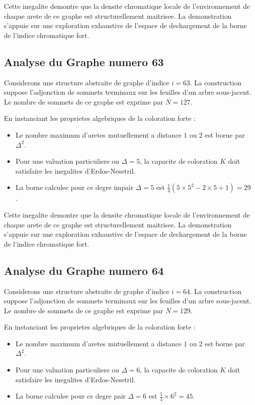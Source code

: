 \documentclass[11pt,a4paper]{article}
\begin{document}
Cette inegalite demontre que la densite chromatique locale de l'environnement de chaque arete de ce graphe est structurellement maitrisee. La demonstration s'appuie sur une exploration exhaustive de l'espace de dechargement de la borne de l'indice chromatique fort.

\subsection{Analyse du Graphe numero 63}
Considerons une structure abstraite de graphe d'indice $i = 63$. La construction suppose l'adjonction de sommets terminaux sur les feuilles d'un arbre sous-jacent. Le nombre de sommets de ce graphe est exprime par $N = 127$.

En instanciant les proprietes algebriques de la coloration forte :
\begin{itemize}
\item Le nombre maximum d'aretes mutuellement a distance $1$ ou $2$ est borne par $\Delta^2$.
\item Pour une valuation particuliere ou $\Delta = 5$, la capacite de coloration $K$ doit satisfaire les inegalites d'Erdos-Nesetril.
\item La borne calculee pour ce degre impair $\Delta = 5$ est $\frac{1}{4}(5 \times 5^2 - 2 \times 5 + 1) = 29$.
\end{itemize}

Cette inegalite demontre que la densite chromatique locale de l'environnement de chaque arete de ce graphe est structurellement maitrisee. La demonstration s'appuie sur une exploration exhaustive de l'espace de dechargement de la borne de l'indice chromatique fort.

\subsection{Analyse du Graphe numero 64}
Considerons une structure abstraite de graphe d'indice $i = 64$. La construction suppose l'adjonction de sommets terminaux sur les feuilles d'un arbre sous-jacent. Le nombre de sommets de ce graphe est exprime par $N = 129$.

En instanciant les proprietes algebriques de la coloration forte :
\begin{itemize}
\item Le nombre maximum d'aretes mutuellement a distance $1$ ou $2$ est borne par $\Delta^2$.
\item Pour une valuation particuliere ou $\Delta = 6$, la capacite de coloration $K$ doit satisfaire les inegalites d'Erdos-Nesetril.
\item La borne calculee pour ce degre pair $\Delta = 6$ est $\frac{5}{4} \times 6^2 = 45$.
\end{itemize}
\end{document}

